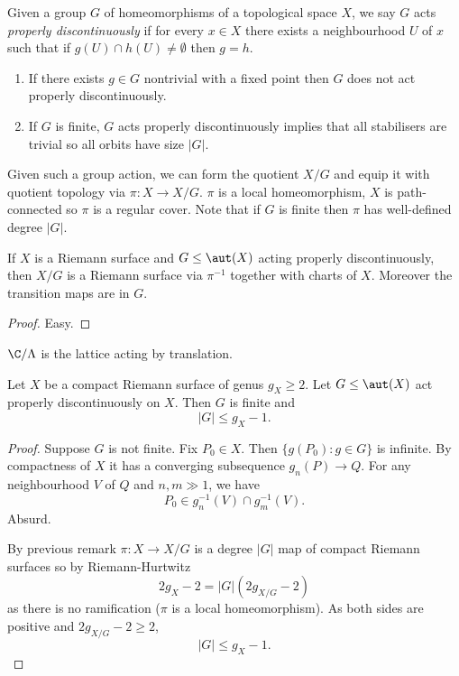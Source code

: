 \documentclass[a4paper]{article}
\begin{document}
\begin{definition}
  Given a group \(G\) of homeomorphisms of a topological space \(X\), we say \(G\) acts \emph{properly discontinuously} if for every \(x \in X\) there exists a neighbourhood \(U\) of \(x\) such that if \(g(U) \cap h(U) \neq \emptyset\) then \(g = h\).
\end{definition}

\begin{remark}\leavevmode
  \begin{enumerate}
  \item If there exists \(g \in G\) nontrivial with a fixed point then \(G\) does not act properly discontinuously.
  \item If \(G\) is finite, \(G\) acts properly discontinuously implies that all stabilisers are trivial so all orbits have size \(|G|\).
  \end{enumerate}
\end{remark}

Given such a group action, we can form the quotient \(X/G\) and equip it with quotient topology via \(\pi: X \to X/G\). \(\pi\) is a local homeomorphism, \(X\) is path-connected so \(\pi\) is a regular cover. Note that if \(G\) is finite then \(\pi\) has well-defined degree \(|G|\).

\begin{lemma}
  If \(X\) is a Riemann surface and \(G \leq \aut(X)\) acting properly discontinuously, then \(X/G\) is a Riemann surface via \(\pi^{-1}\) together with charts of \(X\). Moreover the transition maps are in \(G\).
\end{lemma}

\begin{proof}
  Easy.
\end{proof}

\begin{eg}
  \(\C/\Lambda\) is the lattice acting by translation.
\end{eg}

\begin{proposition}[Hurwitz]
  Let \(X\) be a compact Riemann surface of genus \(g_X \geq 2\). Let \(G \leq \aut(X)\) act properly discontinuously on \(X\). Then \(G\) is finite and
  \[
    |G| \leq g_X - 1.
  \]
\end{proposition}

\begin{proof}
  Suppose \(G\) is not finite. Fix \(P_0 \in X\). Then \(\{g(P_0): g \in G\}\) is infinite. By compactness of \(X\) it has a converging subsequence \(g_n(P) \to Q\). For any neighbourhood \(V\) of \(Q\) and \(n, m \gg 1\), we have
  \[
    P_0 \in g_n^{-1}(V) \cap g_m^{-1}(V).
  \]
  Absurd.

  By previous remark \(\pi: X \to X/G\) is a degree \(|G|\) map of compact Riemann surfaces so by Riemann-Hurtwitz
  \[
    2g_X - 2 = |G| (2g_{X/G} - 2)
  \]
  as there is no ramification (\(\pi\) is a local homeomorphism). As both sides are positive and \(2g_{X/G} - 2 \geq 2\),
  \[
    |G| \leq g_X - 1.
  \]
\end{proof}
\end{document}
